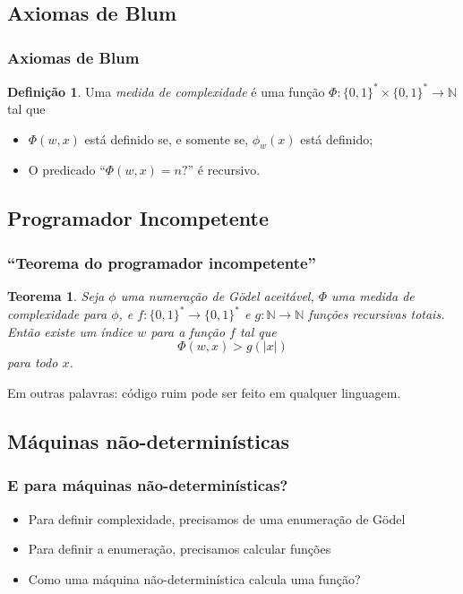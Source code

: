 \documentclass[utf8,notheorems]{beamer}
\newtheorem*{theorem}{Teorema}
\theoremstyle{definition}
\newtheorem*{definition}{Definição}
\begin{document}
\subsection{Axiomas de Blum}
\begin{frame}
    \frametitle{Axiomas de Blum}
    \begin{definition}
        Uma \emph{medida de complexidade}
        é uma função $\Phi:\{0, 1\}^* \times \{0, 1\}^* \to \mathbb N$
        tal que
        \begin{itemize}
            \item $\Phi(w, x)$ está definido se, e somente se, $\phi_w(x)$ está definido;
            \item O predicado ``$\Phi(w, x) = n?$'' é recursivo.
        \end{itemize}
    \end{definition}
\end{frame}

\subsection{Programador Incompetente}
\begin{frame}
    \frametitle{``Teorema do programador incompetente''}
    \begin{theorem}
        Seja $\phi$ uma numeração de Gödel aceitável,
        $\Phi$ uma medida de complexidade para $\phi$,
        e $f: \{0, 1\}^* \to \{0, 1\}^*$ e $g: \mathbb N \to \mathbb N$
        funções recursivas totais.
        Então existe um índice $w$ para a função $f$ tal que
        \begin{equation*}
            \Phi(w, x) > g(|x|)
        \end{equation*}
        para todo $x$.
    \end{theorem}

    \pause
    Em outras palavras: código ruim pode ser feito em qualquer linguagem.
\end{frame}

\subsection{Máquinas não-determinísticas}
\begin{frame}
    \frametitle{E para máquinas não-determinísticas?}

    \begin{itemize}
        \item Para definir complexidade, precisamos de uma enumeração de Gödel
        \item Para definir a enumeração, precisamos calcular funções
        \item Como uma máquina não-determinística calcula uma função?
    \end{itemize}
\end{frame}
\end{document}
